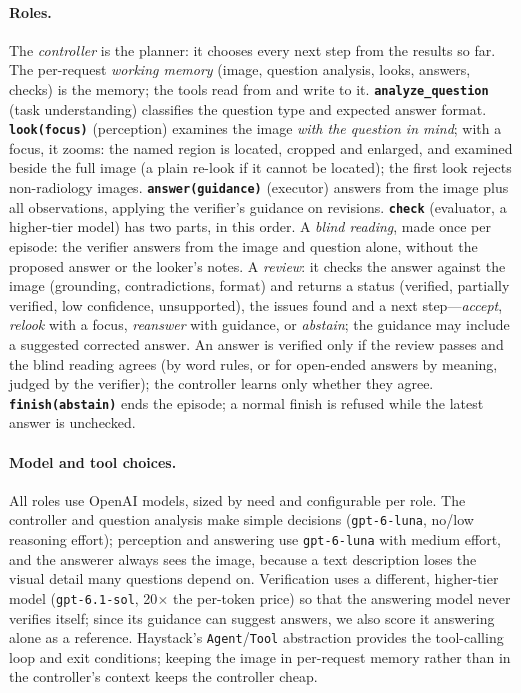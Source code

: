 \documentclass{article}
\begin{document}
\paragraph{Roles.} The \emph{controller} is the planner: it chooses every next step from the results so far.
The per-request \emph{working memory} (image, question analysis, looks, answers, checks) is the memory; the tools
read from and write to it.
\textbf{\texttt{analyze\_question}} (task understanding) classifies the question type and expected answer format.
\textbf{\texttt{look(focus)}} (perception) examines the image \emph{with the question in mind}; with a focus, it
zooms: the named region is located, cropped and enlarged, and examined beside the full image (a plain re-look if
it cannot be located); the first look rejects
non-radiology images.
\textbf{\texttt{answer(guidance)}} (executor) answers from the image plus all observations, applying the
verifier's guidance on revisions.
\textbf{\texttt{check}} (evaluator, a higher-tier model) has two parts, in this order. A \emph{blind reading}, made once per episode: the
verifier answers from the image and question alone, without the proposed answer or the looker's notes. A
\emph{review}: it checks the answer against the image (grounding, contradictions, format) and returns a status
(verified, partially verified, low confidence, unsupported), the issues found and a next step---\emph{accept},
\emph{relook} with a focus, \emph{reanswer} with guidance, or \emph{abstain}; the guidance may include a suggested
corrected answer. An answer is verified only if the review passes and the blind reading agrees (by word rules, or for
open-ended answers by meaning, judged by the verifier); the controller learns only whether they agree.
\textbf{\texttt{finish(abstain)}} ends the episode; a normal finish is refused while the latest answer is unchecked.

\paragraph{Model and tool choices.} All roles use OpenAI models, sized by need and configurable per role. The
controller and question analysis make simple decisions (\texttt{gpt-6-luna}, no/low reasoning effort); perception
and answering use \texttt{gpt-6-luna} with medium effort, and the answerer always sees the image, because a
text description loses the visual detail many questions depend on. Verification uses a different, higher-tier model
(\texttt{gpt-6.1-sol}, 20$\times$ the per-token price) so that the answering model never verifies itself; since its guidance can suggest answers,
we also score it answering alone as a reference. Haystack's \texttt{Agent}/\texttt{Tool}
abstraction provides the tool-calling loop and exit conditions; keeping the image in per-request memory rather than
in the controller's context keeps the controller cheap.
\end{document}
